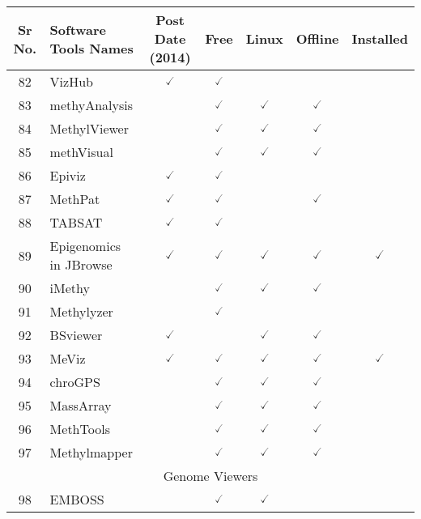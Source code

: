 \documentclass[10pt,letterpaper]{article}
\begin{document}
\begin{table}[!ht]
\begin{adjustwidth}{-2.25in}{0in} %
\centering
\begin{tabular}{|c|l|c|c|c|c|c|}
\hline
Sr No. & Software Tools Names & Post Date (2014) & Free & Linux & Offline & Installed \\ \hline
\hline
82 & VizHub\cite{hotez2016blue} & $\checked$ & $\checked$ & & & \\
83 & methyAnalysis\cite{du2013methyanalysis} & & $\checked$ & $\checked$ & $\checked$ & \\ 
84 & MethylViewer\cite{pardo2010methylviewer} & & $\checked$ & $\checked$ & $\checked$ & \\
85 & methVisual\cite{zackay2010methvisual} & & $\checked$ & $\checked$ & $\checked$ & \\
86 & Epiviz\cite{chelaru2014epiviz} & $\checked$ & $\checked$ & & & \\
87 & MethPat\cite{wong2016methpat} & $\checked$ & $\checked$ & & $\checked$ & \\
88 & TABSAT\cite{pabinger2016analysis} & $\checked$ &  $\checked$ & & & \\
89 & Epigenomics in JBrowse\cite{hofmeister2018enhanced} & $\checked$ & $\checked$ & $\checked$ & $\checked$ & $\checked$  \\
90 & iMethy\cite{leakey1990simultaneous} & & $\checked$ & $\checked$ &$\checked$  & \\
91 & Methylyzer\cite{fernandez2009dynamic} & & $\checked$ & & & \\
92 & BSviewer\cite{sun2017bsviewer} & $\checked$ & & $\checked$ & $\checked$ & \\
93 & MeViz\cite{perez2018storage} & $\checked$ & $\checked$ & $\checked$ & $\checked$ & $\checked$ \\ 
94 & chroGPS\cite{font2013chrogps} & & $\checked$ & $\checked$ & $\checked$ & \\ 
95 & MassArray\cite{gabriel2009snp} & & $\checked$ & $\checked$ & $\checked$ & \\ 
96 & MethTools\cite{grunau2000methtools} & & $\checked$ & $\checked$ & $\checked$ & \\ 
97 & Methylmapper\cite{ordway2005methylmapper} & & $\checked$ & $\checked$ & $\checked$ & \\ \hline
\hline
\multicolumn{7}{|c|}{Genome Viewers} \\ \hline
\hline
98 & EMBOSS\cite{rice2000emboss} & & $\checked$ & $\checked$ & & \\ 

\end{tabular}
\end{adjustwidth}
\end{table}
\end{document}
